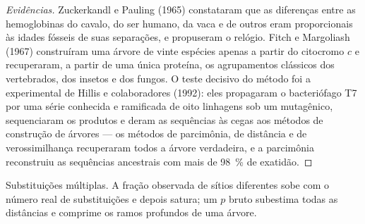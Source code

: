 \begin{proof}[Evidências]
Zuckerkandl e Pauling (1965) constataram que as diferenças entre as
hemoglobinas do cavalo, do ser humano, da vaca e de outros eram
proporcionais às idades fósseis de suas separações, e propuseram o
relógio. Fitch e Margoliash (1967) construíram uma árvore de vinte
espécies apenas a partir do citocromo
$c$ e recuperaram, a partir de uma única proteína, os agrupamentos
clássicos dos vertebrados, dos insetos e dos fungos. O teste decisivo do
método foi a  experimental de Hillis e colaboradores (1992):
eles propagaram o bacteriófago T7 por uma série conhecida e ramificada
de oito linhagens sob um mutagênico, sequenciaram os produtos e deram as
sequências às cegas aos métodos de construção de árvores --- os métodos
de parcimônia, de distância e de verossimilhança recuperaram todos a
árvore verdadeira, e a parcimônia reconstruiu as sequências ancestrais
com mais de \qty{98}{\%} de exatidão.
\end{proof}

\begin{omfigure}

{\small Substituições múltiplas. A fração observada de sítios diferentes
sobe com o número real de substituições e depois satura; um $p$ bruto
subestima todas as distâncias e comprime os ramos profundos de uma
árvore.}
\end{omfigure}

